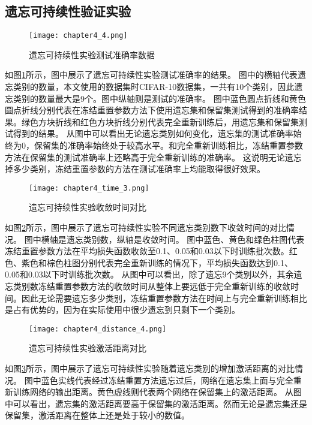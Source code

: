 \subsection{遗忘可持续性验证实验}
\begin{figure}
    \centering
    \texttt{[image: chapter4\_4.png]}
    \caption{遗忘可持续性实验测试准确率数据}
    \label{fig:chapter4_4}
\end{figure}

如图\ref{fig:chapter4_4}所示，图中展示了遗忘可持续性实验测试准确率的结果。
图中的横轴代表遗忘类别的数量，本文使用的数据集时CIFAR-10数据集，一共有10个类别，因此遗忘类别的数量最大是9个。图中纵轴则是测试的准确率。
图中蓝色圆点折线和黄色圆点折线分别代表在冻结重置参数方法下使用遗忘集和保留集测试得到的准确率结果。绿色方块折线和红色方块折线分别代表完全重新训练后，用遗忘集和保留集测试得到的结果。
从图中可以看出无论遗忘类别如何变化，遗忘集的测试准确率始终为0，保留集的准确率始终处于较高水平。和完全重新训练相比，冻结重置参数方法在保留集的测试准确率上还略高于完全重新训练的准确率。
这说明无论遗忘掉多少类别，冻结重置参数的方法在测试准确率上均能取得很好效果。

\begin{figure}
    \centering
    \texttt{[image: chapter4\_time\_3.png]}
    \caption{遗忘可持续性实验收敛时间对比}
    \label{fig:chapter4_time_3}
\end{figure}

如图\ref{fig:chapter4_time_3}所示，图中展示了遗忘可持续性实验不同遗忘类别数下收敛时间的对比情况。
图中横轴是遗忘类别数，纵轴是收敛时间。
图中蓝色、黄色和绿色柱图代表冻结重置参数方法在平均损失函数收敛至0.1、0.05和0.03以下时训练批次数。红色、紫色和棕色柱图分别代表完全重新训练的情况下，平均损失函数达到0.1、0.05和0.03以下时训练批次数。
从图中可以看出，除了遗忘9个类别以外，其余遗忘类别数冻结重置参数方法的收敛时间从整体上要远低于完全重新训练的收敛时间。因此无论需要遗忘多少类别，冻结重置参数方法在时间上与完全重新训练相比是占有优势的，因为在实际使用中很少遗忘到只剩下一个类别。

\begin{figure}
    \centering
    \texttt{[image: chapter4\_distance\_4.png]}
    \caption{遗忘可持续性实验激活距离对比}
    \label{fig:chapter4_distance_4}
\end{figure}

如图\ref{fig:chapter4_distance_4}所示，图中展示了遗忘可持续性实验随着遗忘类别的增加激活距离的对比情况。
图中蓝色实线代表经过冻结重置方法遗忘过后，网络在遗忘集上面与完全重新训练网络的输出距离。黄色虚线则代表两个网络在保留集上的激活距离。
从图中可以看出，遗忘集的激活距离要高于保留集的激活距离。然而无论是遗忘集还是保留集，激活距离在整体上还是处于较小的数值。

